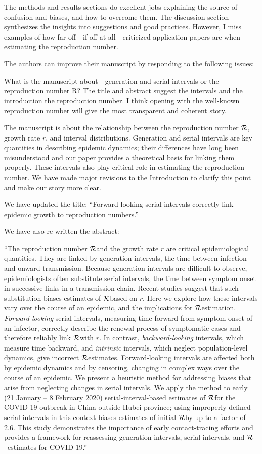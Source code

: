 \documentclass[12pt]{article}
\newcommand{\RR}{\ensuremath{{\cal R}}}
\newcommand{\revtext}{\textsf}
\begin{document}
\revtext{The methods and results sections do excellent jobs explaining the source of confusion and biases, and how to overcome them. The discussion section synthesizes the insights into suggestions and good practices. However, I miss examples of how far off - if off at all - criticized application papers are when estimating the reproduction number.}

\revtext{The authors can improve their manuscript by responding to the following issues:}

\revtext{What is the manuscript about - generation and serial intervals or the reproduction number R? The title and abstract suggest the intervals and the introduction the reproduction number. I think opening with the well-known reproduction number will give the most transparent and coherent story.}

The manuscript is about the relationship between the reproduction number $\RR$, growth rate $r$, and interval distributions. Generation and serial intervals are key quantities in describing epidemic dynamics; their differences have long been misunderstood and our paper provides a theoretical basis for linking them properly. These intervals also play critical role in estimating the reproduction number. We have made major revisions to the Introduction to clarify this point and make our story more clear.

We have updated the title: ``Forward-looking serial intervals correctly link epidemic growth to reproduction numbers.''

We have also re-written the abstract: 

``The reproduction number \RR and the growth rate $r$ are critical epidemiological quantities.
They are linked by generation intervals, the time between infection and onward transmission.
Because generation intervals are difficult to observe, epidemiologists often substitute serial intervals, the time between symptom onset in successive links in a transmission chain.
Recent studies suggest that such substitution biases estimates of \RR based on $r$.
Here we explore how these intervals vary over the course of an epidemic, and the implications for \RR estimation.
\emph{Forward-looking} serial intervals, measuring time forward from symptom onset of an infector, correctly describe the renewal process of symptomatic cases and therefore reliably link \RR with $r$.
In contrast, \emph{backward-looking} intervals, which measure time backward, and \emph{intrinsic} intervals, which neglect population-level dynamics, give incorrect \RR estimates.
Forward-looking intervals are affected both by epidemic dynamics and by censoring, changing in complex ways over the course of an epidemic.
We present a heuristic method for addressing biases that arise from neglecting changes in serial intervals. 
We apply the method to early (21 January -- 8 February 2020) serial-interval-based estimates of  \RR for the COVID-19 outbreak in China outside Hubei province; using improperly defined serial intervals in this context biases estimates of initial \RR by up to a factor of 2.6.
This study demonstrates the importance of early contact-tracing efforts and provides a framework for reassessing generation intervals, serial intervals, and \RR\ estimates for COVID-19.''
\end{document}
